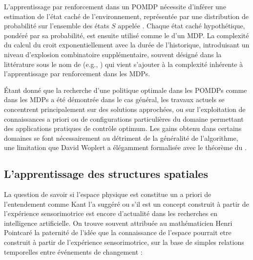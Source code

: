 L'apprentissage par renforcement dans un POMDP nécessite d'inférer une estimation de l'état caché de l'environnement, représentée par une distribution de probabilité sur l'ensemble des états $S$ appelée . 
Chaque état caché hypothétique, pondéré par sa probabilité, est ensuite utilisé comme le  d'un MDP. 
La complexité du calcul du  croit exponentiellement avec la durée de l'historique, introduisant un niveau d'explosion combinatoire supplémentaire, souvent désigné dans la littérature sous le nom de  (e.g., \cite{zhang_curses_2025}) qui vient s'ajouter à la complexité inhérente à l'apprentissage par renforcement dans les MDPs.  

Étant donné que la recherche d’une politique optimale dans les POMDPs comme dans les MDPs a été démontrée  dans le cas général, les travaux actuels se concentrent principalement sur des solutions approchées, ou sur l’exploitation de connaissances a priori ou de configurations particulières du domaine permettant des applications pratiques de contrôle optimum.
Les gains obtenu dans certains domaines se font nécessairement au détriment de la généralité de l'algorithme, une limitation que David Woplert a élégamment formalisée avec le théorème du  \og {} \fg \cite{wolpert_no_1997}.





\subsection{L'apprentissage des structures spatiales}

\noindent
La question de savoir si l'espace physique est constitue un \og a priori de l'entendement \fg comme Kant l'a suggéré ou s'il est un concept construit à partir de l'expérience sensorimotrice est encore d'actualité dans les recherches en intelligence artificielle. 
On trouve souvent attribuée au mathématicien Henri Pointcaré la paternité de l'idée que la connaissance de l'espace pourrait etre construit à partir de l'expérience sensorimotrice, sur la base de simples relations temporelles entre événements de changement : 


